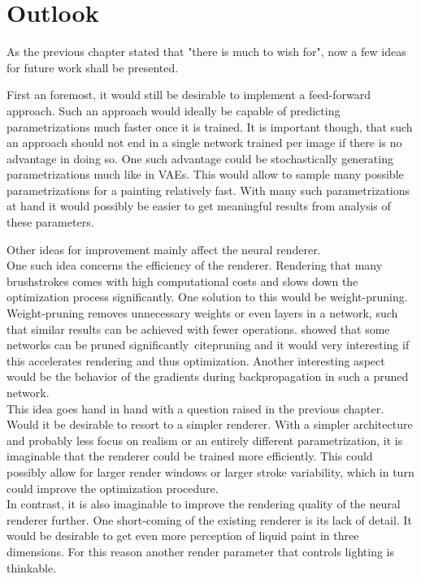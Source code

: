 \setchapterpreamble[u]{\margintoc}
\chapter{Outlook}

As the previous chapter stated that "there is much to wish for", now a few ideas for future work shall be presented.

First an foremost, it would still be desirable to implement a feed-forward approach.
Such an approach would ideally be capable of predicting parametrizations much faster once it is trained.
It is important though, that such an approach should not end in a single network trained per image if there is no advantage in doing so.
One such advantage could be stochastically generating parametrizations much like in VAEs.
This would allow to sample many possible parametrizations for a painting relatively fast.
With many such parametrizations at hand it would possibly be easier to get meaningful results from analysis of these parameters.

Other ideas for improvement mainly affect the neural renderer.\\
One such idea concerns the efficiency of the renderer.
Rendering that many brushstrokes comes with high computational costs and slows down the optimization process significantly.
One solution to this would be weight-pruning.
Weight-pruning removes unnecessary weights or even layers in a network, such that similar results can be achieved with fewer operations.
\citeauthor*{pruning} showed that some networks can be pruned significantly~cite{pruning} and it would very interesting if this accelerates rendering and thus optimization.
Another interesting aspect would be the behavior of the gradients during backpropagation in such a pruned network.\\
This idea goes hand in hand with a question raised in the previous chapter.
Would it be desirable to resort to a simpler renderer.
With a simpler architecture and probably less focus on realism or an entirely different parametrization, it is imaginable that the renderer could be trained more efficiently.
This could possibly allow for larger render windows or larger stroke variability, which in turn could improve the optimization procedure. \\
In contrast, it is also imaginable to improve the rendering quality of the neural renderer further.
One short-coming of the existing renderer is its lack of detail.
It would be desirable to get even more perception of liquid paint in three dimensions.
For this reason another render parameter that controls lighting is thinkable. \\


